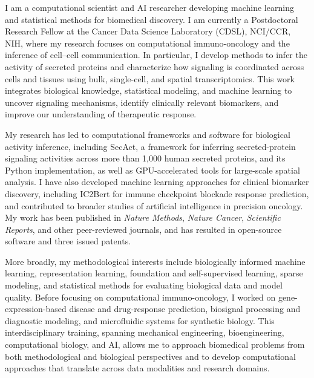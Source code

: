 

\begin{cvparagraph}

I am a computational scientist and AI researcher developing machine learning and statistical methods for biomedical discovery. I am currently a Postdoctoral Research Fellow at the Cancer Data Science Laboratory (CDSL), NCI/CCR, NIH, where my research focuses on computational immuno-oncology and the inference of cell--cell communication. In particular, I develop methods to infer the activity of secreted proteins and characterize how signaling is coordinated across cells and tissues using bulk, single-cell, and spatial transcriptomics. This work integrates biological knowledge, statistical modeling, and machine learning to uncover signaling mechanisms, identify clinically relevant biomarkers, and improve our understanding of therapeutic response.

My research has led to computational frameworks and software for biological activity inference, including SecAct, a framework for inferring secreted-protein signaling activities across more than 1,000 human secreted proteins, and its Python implementation, as well as GPU-accelerated tools for large-scale spatial analysis. I have also developed machine learning approaches for clinical biomarker discovery, including IC2Bert for immune checkpoint blockade response prediction, and contributed to broader studies of artificial intelligence in precision oncology. My work has been published in \textit{Nature Methods}, \textit{Nature Cancer}, \textit{Scientific Reports}, and other peer-reviewed journals, and has resulted in open-source software and three issued patents.

More broadly, my methodological interests include biologically informed machine learning, representation learning, foundation and self-supervised learning, sparse modeling, and statistical methods for evaluating biological data and model quality. Before focusing on computational immuno-oncology, I worked on gene-expression-based disease and drug-response prediction, biosignal processing and diagnostic modeling, and microfluidic systems for synthetic biology. This interdisciplinary training, spanning mechanical engineering, bioengineering, computational biology, and AI, allows me to approach biomedical problems from both methodological and biological perspectives and to develop computational approaches that translate across data modalities and research domains.

\end{cvparagraph}
